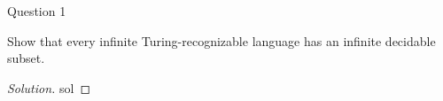 \begin{solution}{Question 1}\label{ques:1}
    \begin{question}
        Show that every infinite Turing-recognizable language has an infinite decidable subset.
    \end{question}
    \tcblower{}
    \begin{proof}[Solution]
        sol
    \end{proof}
\end{solution}
